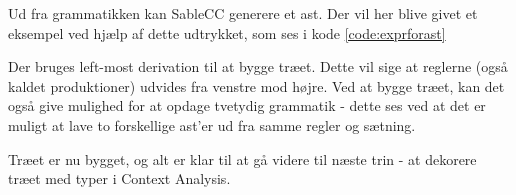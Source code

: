 

\noindent Ud fra grammatikken kan SableCC generere et \gls{ast}. Der vil her blive givet et eksempel ved hjælp af dette udtrykket, som ses i kode \ref{code:exprforast}


\noindent Der bruges left-most derivation til at bygge træet. Dette vil sige at reglerne (også kaldet produktioner) udvides fra venstre mod højre. Ved at bygge træet, kan det også give mulighed for at opdage tvetydig grammatik - dette ses ved at det er muligt at lave to forskellige \gls{ast}'er ud fra samme regler og sætning.


\noindent Træet er nu bygget, og alt er klar til at gå videre til næste trin - at dekorere træet med typer i Context Analysis.